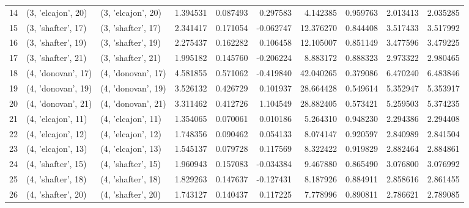\begin{tabular}{lllrrrrrrr}
14 &  (3, 'elcajon', 20) &  (3, 'elcajon', 20) &  1.394531 &   0.087493 &  0.297583 &   4.142385 &  0.959763 &   2.013413 &  2.035285 \\
15 &  (3, 'shafter', 17) &  (3, 'shafter', 17) &  2.341417 &   0.171054 & -0.062747 &  12.376270 &  0.844408 &   3.517433 &  3.517992 \\
16 &  (3, 'shafter', 19) &  (3, 'shafter', 19) &  2.275437 &   0.162282 &  0.106458 &  12.105007 &  0.851149 &   3.477596 &  3.479225 \\
17 &  (3, 'shafter', 21) &  (3, 'shafter', 21) &  1.995182 &   0.145760 & -0.206224 &   8.883172 &  0.888323 &   2.973322 &  2.980465 \\
18 &  (4, 'donovan', 17) &  (4, 'donovan', 17) &  4.581855 &   0.571062 & -0.419840 &  42.040265 &  0.379086 &   6.470240 &  6.483846 \\
19 &  (4, 'donovan', 19) &  (4, 'donovan', 19) &  3.526132 &   0.426729 &  0.101937 &  28.664428 &  0.549614 &   5.352947 &  5.353917 \\
20 &  (4, 'donovan', 21) &  (4, 'donovan', 21) &  3.311462 &   0.412726 &  1.104549 &  28.882405 &  0.573421 &   5.259503 &  5.374235 \\
21 &  (4, 'elcajon', 11) &  (4, 'elcajon', 11) &  1.354065 &   0.070061 &  0.010186 &   5.264310 &  0.948230 &   2.294386 &  2.294408 \\
22 &  (4, 'elcajon', 12) &  (4, 'elcajon', 12) &  1.748356 &   0.090462 &  0.054133 &   8.074147 &  0.920597 &   2.840989 &  2.841504 \\
23 &  (4, 'elcajon', 13) &  (4, 'elcajon', 13) &  1.545137 &   0.079728 &  0.117569 &   8.322422 &  0.919829 &   2.882464 &  2.884861 \\
24 &  (4, 'shafter', 15) &  (4, 'shafter', 15) &  1.960943 &   0.157083 & -0.034384 &   9.467880 &  0.865490 &   3.076800 &  3.076992 \\
25 &  (4, 'shafter', 18) &  (4, 'shafter', 18) &  1.829263 &   0.147637 & -0.127431 &   8.187926 &  0.884911 &   2.858616 &  2.861455 \\
26 &  (4, 'shafter', 20) &  (4, 'shafter', 20) &  1.743127 &   0.140437 &  0.117225 &   7.778996 &  0.890811 &   2.786621 &  2.789085 \\
\bottomrule
\end{tabular}
